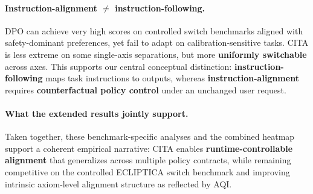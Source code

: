 \paragraph{\textbf{Instruction-alignment $\neq$ instruction-following.}}
DPO can achieve very high scores on controlled switch benchmarks aligned with safety-dominant preferences, yet fail to adapt on calibration-sensitive tasks.
\textsc{CITA} is less extreme on some single-axis separations, but more \textbf{uniformly switchable} across axes.
This supports our central conceptual distinction:
\textbf{instruction-following} maps task instructions to outputs,
whereas \textbf{instruction-alignment} requires \textbf{counterfactual policy control} under an unchanged user request.

\vspace{-0.2em}
\paragraph{\textbf{What the extended results jointly support.}}
Taken together, these benchmark-specific analyses and the combined heatmap support a coherent empirical narrative:
\textsc{CITA} enables \textbf{runtime-controllable alignment} that generalizes across multiple policy contracts,
while remaining competitive on the controlled ECLIPTICA switch benchmark and improving intrinsic axiom-level alignment structure as reflected by AQI.
    